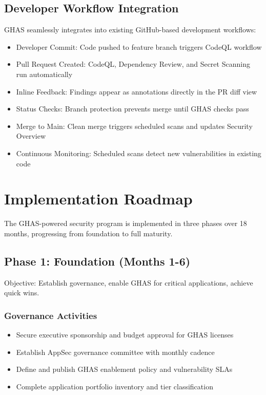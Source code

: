 \documentclass[11pt]{article}
\begin{document}
\subsection{Developer Workflow Integration}

GHAS seamlessly integrates into existing GitHub-based development workflows:

\begin{itemize}[leftmargin=*]
\item Developer Commit: Code pushed to feature branch triggers CodeQL workflow
\item Pull Request Created: CodeQL, Dependency Review, and Secret Scanning run automatically
\item Inline Feedback: Findings appear as annotations directly in the PR diff view
\item Status Checks: Branch protection prevents merge until GHAS checks pass
\item Merge to Main: Clean merge triggers scheduled scans and updates Security Overview
\item Continuous Monitoring: Scheduled scans detect new vulnerabilities in existing code
\end{itemize}
\section{Implementation Roadmap}

The GHAS-powered security program is implemented in three phases over 18 months, progressing from foundation to full maturity.

\subsection{Phase 1: Foundation (Months 1-6)}

Objective: Establish governance, enable GHAS for critical applications, achieve quick wins.

\subsubsection{Governance Activities}

\begin{itemize}[leftmargin=*]
\item Secure executive sponsorship and budget approval for GHAS licenses
\item Establish AppSec governance committee with monthly cadence
\item Define and publish GHAS enablement policy and vulnerability SLAs
\item Complete application portfolio inventory and tier classification
\end{itemize}
\end{document}
